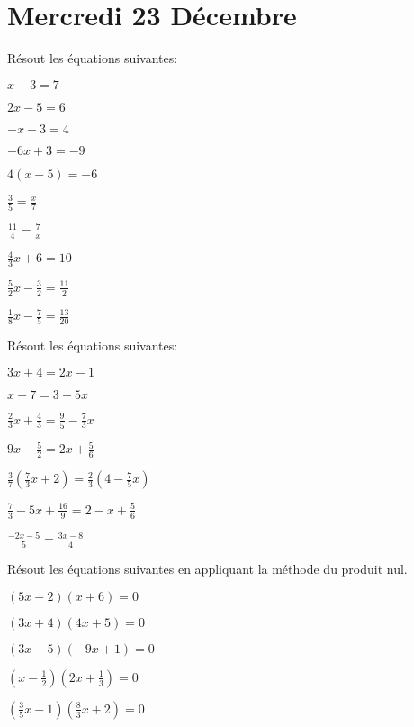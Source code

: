 \section{Mercredi 23 Décembre}

\begin{exercice}
    Résout les équations suivantes:
    \begin{exerciceenumnoeq}
        \item $x+3=7$
        \item $2x-5=6$
        \item $-x-3=4$
        \item $-6x+3=-9$
        \item $4(x-5) = -6$
        \item $\frac35 = \frac{x}7$
        \item $\frac{11}4 = \frac7x$
        \item $\frac43x + 6 = 10$
        \item $\frac52x - \frac32 = \frac{11}2$
        \item $\frac18x - \frac75 = \frac{13}{20}$
    \end{exerciceenumnoeq}
\end{exercice}

\begin{exercice}
    Résout les équations suivantes:
    \begin{exerciceenumnoeq}
        \item $3x+4 = 2x-1$
        \item $x+7 = 3-5x$
        \item $\frac23x + \frac43 = \frac95 - \frac73x$
        \item $9x - \frac52 = 2x+\frac56$
        \item $\frac37\left(\frac73x + 2\right) = \frac23\left(4 - \frac75x\right)$
        \item $\frac73 - 5x + \frac{16}9 = 2 - x + \frac56$
        \item $\frac{-2x-5}5 = \frac{3x-8}4$
    \end{exerciceenumnoeq}
\end{exercice}

\begin{exercice}
    Résout les équations suivantes en appliquant la méthode du produit nul.
    \begin{exerciceenumnoeq}
        \item $(5x-2)(x+6) = 0$
        \item $(3x+4)(4x+5) = 0$
        \item $(3x-5)(-9x+1) = 0$
        \item $\left(x-\frac12\right)\left(2x+\frac13\right)=0$
        \item $\left(\frac35x-1\right)\left(\frac83x+2\right) = 0$
    \end{exerciceenumnoeq}
\end{exercice}


